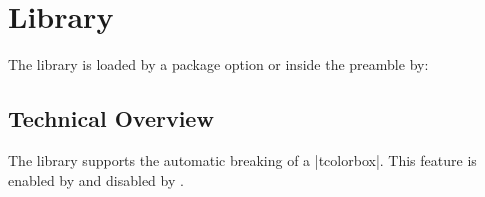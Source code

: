 \clearpage
\section{Library }\label{sec:breakable}%
%
The library is loaded by a package option or inside the preamble by:
\begin{dispListing}
\end{dispListing}

\subsection{Technical Overview}
The library  supports the automatic breaking of a |tcolorbox|.
This feature is enabled by 
and disabled by .

